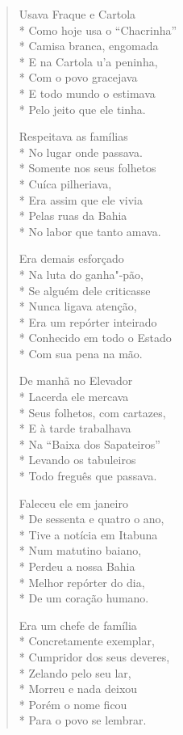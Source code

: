 \begin{verse}
Usava Fraque e Cartola\\*
Como hoje usa o ``Chacrinha''\\*
Camisa branca, engomada\\*
E na Cartola u'a peninha,\\*
Com o povo gracejava\\*
E todo mundo o estimava\\*
Pelo jeito que ele tinha.

Respeitava as famílias\\*
No lugar onde passava.\\*
Somente nos seus folhetos\\*
Cuíca pilheriava,\\*
Era assim que ele vivia\\*
Pelas ruas da Bahia\\*
No labor que tanto amava.

Era demais esforçado\\*
Na luta do ganha"-pão,\\*
Se alguém dele criticasse\\*
Nunca ligava atenção,\\*
Era um repórter inteirado\\*
Conhecido em todo o Estado\\*
Com sua pena na mão.

De manhã no Elevador\\*
Lacerda ele mercava\\*
Seus folhetos, com cartazes,\\*
E à tarde trabalhava\\*
Na ``Baixa dos Sapateiros''\\*
Levando os tabuleiros\\*
Todo freguês que passava.

Faleceu ele em janeiro\\*
De sessenta e quatro o ano,\\*
Tive a notícia em Itabuna\\*
Num matutino baiano,\\*
Perdeu a nossa Bahia\\*
Melhor repórter do dia,\\*
De um coração humano.

Era um chefe de família\\*
Concretamente exemplar,\\*
Cumpridor dos seus deveres,\\*
Zelando pelo seu lar,\\*
Morreu e nada deixou\\*
Porém o nome ficou\\*
Para o povo se lembrar.


\end{verse}
